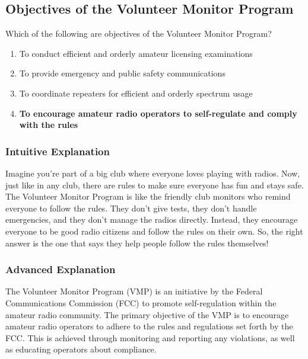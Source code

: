 \subsection{Objectives of the Volunteer Monitor Program}
\label{G2D02}

\begin{tcolorbox}[colback=gray!10!white,colframe=black!75!black,title=G2D02]
Which of the following are objectives of the Volunteer Monitor Program?
\begin{enumerate}[label=\Alph*,noitemsep]
    \item To conduct efficient and orderly amateur licensing examinations
    \item To provide emergency and public safety communications
    \item To coordinate repeaters for efficient and orderly spectrum usage
    \item \textbf{To encourage amateur radio operators to self-regulate and comply with the rules}
\end{enumerate}
\end{tcolorbox}

\subsubsection{Intuitive Explanation}
Imagine you're part of a big club where everyone loves playing with radios. Now, just like in any club, there are rules to make sure everyone has fun and stays safe. The Volunteer Monitor Program is like the friendly club monitors who remind everyone to follow the rules. They don't give tests, they don't handle emergencies, and they don't manage the radios directly. Instead, they encourage everyone to be good radio citizens and follow the rules on their own. So, the right answer is the one that says they help people follow the rules themselves!

\subsubsection{Advanced Explanation}
The Volunteer Monitor Program (VMP) is an initiative by the Federal Communications Commission (FCC) to promote self-regulation within the amateur radio community. The primary objective of the VMP is to encourage amateur radio operators to adhere to the rules and regulations set forth by the FCC. This is achieved through monitoring and reporting any violations, as well as educating operators about compliance.

